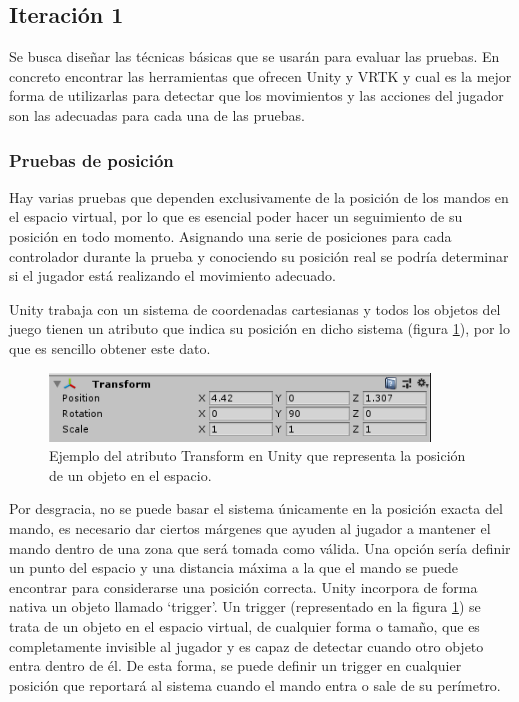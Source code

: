 
\subsection{Iteración 1}

Se busca diseñar las técnicas básicas que se usarán para evaluar las pruebas. En concreto encontrar las herramientas que ofrecen Unity y VRTK y cual es la mejor forma de utilizarlas para detectar que los movimientos y las acciones del jugador son las adecuadas para cada una de las pruebas.

\subsubsection{Pruebas de posición}

Hay varias pruebas que dependen exclusivamente de la posición de los mandos en el espacio virtual, por lo que es esencial poder hacer un seguimiento de su posición en todo momento. Asignando una serie de posiciones para cada controlador durante la prueba y conociendo su posición real se podría determinar si el jugador está realizando el movimiento adecuado.

Unity trabaja con un sistema de coordenadas cartesianas y todos los objetos del juego tienen un atributo que indica su posición en dicho sistema (figura \ref{fig:E2_transform}), por lo que es sencillo obtener este dato.

\begin{figure}
  \centering
    \includegraphics[width=0.9\textwidth]{04.Desarrollo/02.Entrega2/01.Iteracion2_1/00.Figuras/01.transform.png}
    \caption{Ejemplo del atributo Transform en Unity que representa la posición de un objeto en el espacio.}
    \label{fig:E2_transform}
\end{figure}

Por desgracia, no se puede basar el sistema únicamente en la posición exacta del mando, es necesario dar ciertos márgenes que ayuden al jugador a mantener el mando dentro de una zona que será tomada como válida. Una opción sería definir un punto del espacio y una distancia máxima a la que el mando se puede encontrar para considerarse una posición correcta. Unity incorpora de forma nativa un objeto llamado ‘trigger’. Un trigger (representado en la figura  \ref{fig:E2_transform}) se trata de un objeto en el espacio virtual, de cualquier forma o tamaño, que es completamente invisible al jugador y es capaz de detectar cuando otro objeto entra dentro de él. De esta forma, se puede definir un trigger en cualquier posición que reportará al sistema cuando el mando entra o sale de su perímetro.


